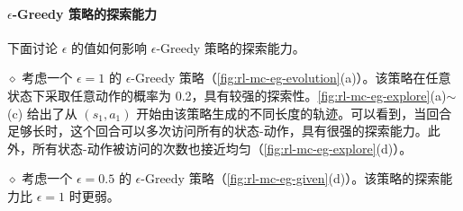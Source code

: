 \paragraph{$\epsilon$-Greedy 策略的探索能力}
下面讨论 $\epsilon$ 的值如何影响 $\epsilon$-Greedy 策略的探索能力。

$\diamond$ 考虑一个 $\epsilon = 1$ 的 $\epsilon$-Greedy 策略（\cref{fig:rl-mc-eg-evolution}(a)）。该策略在任意状态下采取任意动作的概率为 0.2，具有较强的探索性。\cref{fig:rl-mc-eg-explore}(a)$\sim$(c) 给出了从 $(s_1, a_1)$ 开始由该策略生成的不同长度的轨迹。可以看到，当回合足够长时，这个回合可以多次访问所有的状态-动作，具有很强的探索能力。此外，所有状态-动作被访问的次数也接近均匀（\cref{fig:rl-mc-eg-explore}(d)）。

$\diamond$ 考虑一个 $\epsilon = 0.5$ 的 $\epsilon$-Greedy 策略（\cref{fig:rl-mc-eg-given}(d)）。该策略的探索能力比 $\epsilon = 1$ 时更弱。

